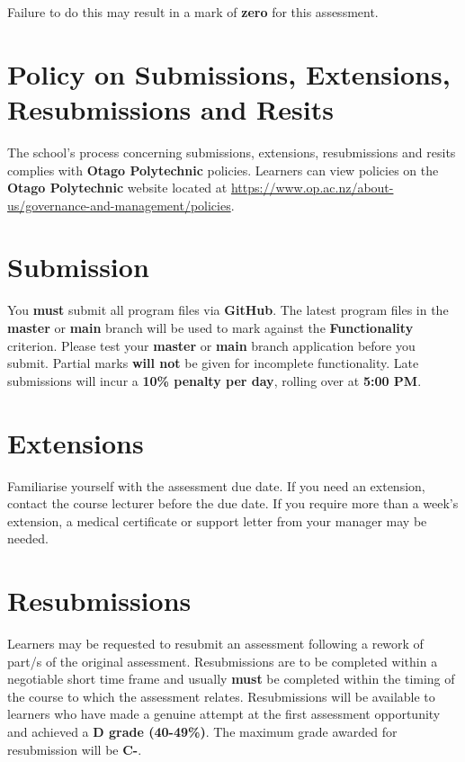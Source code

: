 \documentclass{article}
\begin{document}
 Failure to do this may result in a mark of \textbf{zero} for this assessment.

\section*{Policy on Submissions, Extensions, Resubmissions and Resits}
The school's process concerning submissions, extensions, resubmissions and resits complies with \textbf{Otago Polytechnic} policies. Learners can view policies on the \textbf{Otago Polytechnic} website located at \href{https://www.op.ac.nz/about-us/governance-and-management/policies}{https://www.op.ac.nz/about-us/governance-and-management/policies}.

\section*{Submission}
You \textbf{must} submit all program files via \textbf{GitHub}. The latest program files in the \textbf{master} or \textbf{main} branch will be used to mark against the \textbf{Functionality} criterion. Please test your \textbf{master} or \textbf{main} branch application before you submit. Partial marks \textbf{will not} be given for incomplete functionality. Late submissions will incur a \textbf{10\% penalty per day}, rolling over at \textbf{5:00 PM}.

\section*{Extensions}
Familiarise yourself with the assessment due date. If you need an extension, contact the course lecturer before the due date. If you require more than a week's extension, a medical certificate or support letter from your manager may be needed.

\section*{Resubmissions}
Learners may be requested to resubmit an assessment following a rework of part/s of the original assessment. Resubmissions are to be completed within a negotiable short time frame and usually \textbf{must} be completed within the timing of the course to which the assessment relates. Resubmissions will be available to learners who have made a genuine attempt at the first assessment opportunity and achieved a \textbf{D grade (40-49\%)}. The maximum grade awarded for resubmission will be \textbf{C-}.
\end{document}
